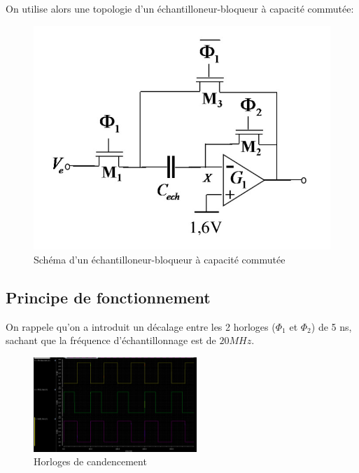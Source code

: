 \documentclass[11pt]{article}
\begin{document}
On utilise alors une topologie d'un \'echantilloneur-bloqueur \`a capacit\'e commut\'ee:

\begin{figure}[!htb]
\begin{center}
  \includegraphics[scale=0.30]{Echantillonneur-bloqueur.jpg}
  \caption{Sch\'ema d'un \'echantilloneur-bloqueur \`a capacit\'e commut\'ee}
\end{center}
\end{figure}

\subsection{Principe de fonctionnement}

On rappele qu'on a introduit un d\'ecalage entre les 2 horloges ($\Phi_1$ et $\Phi_2$) de 5 ns, sachant que la
fr\'equence d'\'echantillonnage est de $20 MHz$.

\begin{figure}
\begin{center}
  \includegraphics[width=0.55\textwidth]{clocks_.png}
\end{center}
\caption{Horloges de candencement}
\end{figure}
\end{document}
